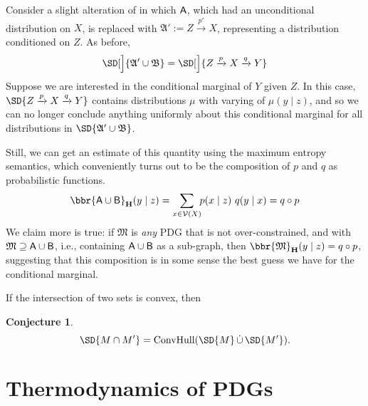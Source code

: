\documentclass{article}
\theoremstyle{plain}
\newtheorem{conj}[theorem]{Conjecture}
\theoremstyle{definition}
\newenvironment{example}
	{\pushQED{\qed}\renewcommand{\qedsymbol}{$\triangle$}\examplex}
	{\popQED\endexamplex%
}
\theoremstyle{remark}
\newcommand\MaxEnt{_{\mathbf H}}
\newcommand{\V}{\mathcal V}
\newcommand{\dg}[1]{\mathfrak{#1}}
\numberwithin{equation}{section}
\begin{document}
\begin{vfull}
	\begin{example}[composition]
		Consider a slight alteration of  in which $\sf A$, which had an unconditional distribution on $X$, is replaced with $\dg A' := Z \xrightarrow{p'} X$, representing a distribution conditioned on $Z$. 
		As before,
		\[ \SD[\Big]{{\dg A' \cup \dg B}} = \SD[\Big]{{Z} \xrightarrow{p} X \xrightarrow{q} Y} \]
		Suppose we are interested in the conditional marginal of $Y$ given $Z$. In this case, $\SD{{Z} \xrightarrow{p} X \xrightarrow{q} Y} $ contains distributions $\mu$ with varying of $\mu(y \mid z)$, and so we can no longer conclude anything uniformly about this conditional marginal for all distributions in $\SD{{\dg A' \cup \dg B}}$. 
		
		Still, we can get an estimate of this quantity using the maximum entropy semantics, which conveniently turns out to be the composition of $p$ and $q$ as probabilistic functions.
		$$ \bbr{{\sf A \cup B}}\MaxEnt(y \mid z) = \sum_{x \in \V(X)}\!\! p (x \mid z)\ q(y \mid x) = q \circ p $$
		We claim more is true: if $\dg M$ is \emph{any} PDG that is not over-constrained, and with $\dg M \supseteq \sf A \cup B$, i.e., containing $\sf A \cup B$ as a sub-graph, then
		$ \bbr{\dg M}\MaxEnt(y \mid z) = q \circ p$,
		suggesting that this composition is in some sense the best guess we have for the conditional marginal. 
	\end{example}

	\begin{vleftovers}
	If the intersection of two sets is convex, then 
	\begin{conj}\label{prop:intersect-set-semantics}
		\[ \SD{M \cap M'} = \text{ConvHull}(\SD{M} \mathop{\dot\cup} \SD{M'}).\]
	\end{conj}
	\end{vleftovers}
\end{vfull}
	
	\section{Thermodynamics of PDGs}\label{sec:thermo}
	
\end{document}
